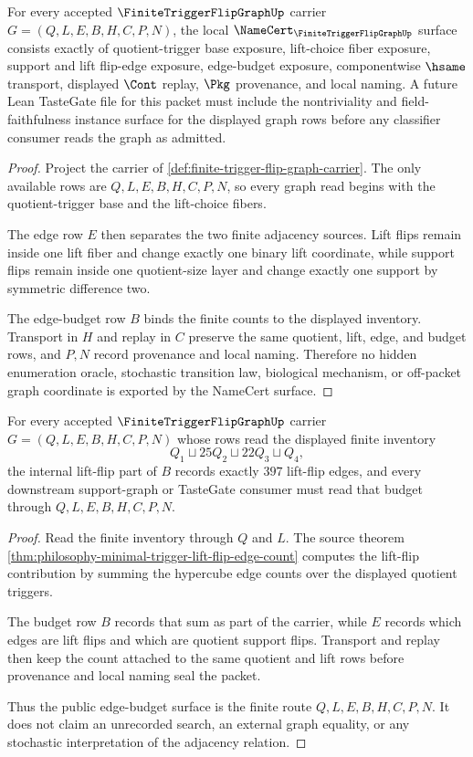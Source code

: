 \begin{theorem}
\label{thm:finite-trigger-flip-graph-namecert-obligations}
For every accepted $\FiniteTriggerFlipGraphUp$ carrier $G=(Q,L,E,B,H,C,P,N)$, the local $\NameCert_{\FiniteTriggerFlipGraphUp}$ surface consists exactly of quotient-trigger base exposure, lift-choice fiber exposure, support and lift flip-edge exposure, edge-budget exposure, componentwise $\hsame$ transport, displayed $\Cont$ replay, $\Pkg$ provenance, and local naming. A future Lean TasteGate file for this packet must include the nontriviality and field-faithfulness instance surface for the displayed graph rows before any classifier consumer reads the graph as admitted.
\end{theorem}
\begin{proof}
Project the carrier of \autoref{def:finite-trigger-flip-graph-carrier}. The only available rows are $Q,L,E,B,H,C,P,N$, so every graph read begins with the quotient-trigger base and the lift-choice fibers.

The edge row $E$ then separates the two finite adjacency sources. Lift flips remain inside one lift fiber and change exactly one binary lift coordinate, while support flips remain inside one quotient-size layer and change exactly one support by symmetric difference two.

The edge-budget row $B$ binds the finite counts to the displayed inventory. Transport in $H$ and replay in $C$ preserve the same quotient, lift, edge, and budget rows, and $P,N$ record provenance and local naming. Therefore no hidden enumeration oracle, stochastic transition law, biological mechanism, or off-packet graph coordinate is exported by the NameCert surface.
\end{proof}

\begin{theorem}
\label{thm:finite-trigger-flip-graph-edge-budget}
For every accepted $\FiniteTriggerFlipGraphUp$ carrier $G=(Q,L,E,B,H,C,P,N)$ whose rows read the displayed finite inventory
$$
Q_{1}\sqcup 25Q_{2}\sqcup 22Q_{3}\sqcup Q_{4},
$$
the internal lift-flip part of $B$ records exactly $397$ lift-flip edges, and every downstream support-graph or TasteGate consumer must read that budget through $Q,L,E,B,H,C,P,N$.
\end{theorem}
\begin{proof}
Read the finite inventory through $Q$ and $L$. The source theorem \autoref{thm:philosophy-minimal-trigger-lift-flip-edge-count} computes the lift-flip contribution by summing the hypercube edge counts over the displayed quotient triggers.

The budget row $B$ records that sum as part of the carrier, while $E$ records which edges are lift flips and which are quotient support flips. Transport and replay then keep the count attached to the same quotient and lift rows before provenance and local naming seal the packet.

Thus the public edge-budget surface is the finite route $Q,L,E,B,H,C,P,N$. It does not claim an unrecorded search, an external graph equality, or any stochastic interpretation of the adjacency relation.
\end{proof}

